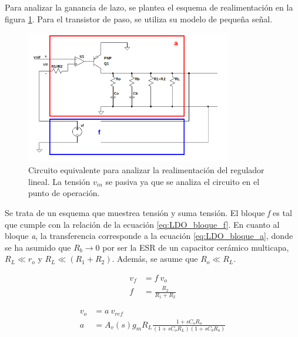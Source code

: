 Para analizar la ganancia de lazo, se plantea el esquema de realimentación en la figura \ref{fig:LDO_esquema_realimentacion}. Para el transistor de paso, se utiliza su modelo de pequeña señal. 

\begin{figure}[H]
    \centering
    \includegraphics[width=0.8\textwidth]{img/LDO_esquema_realimentacion.png}
    \caption{Circuito equivalente para analizar la realimentación del regulador lineal. La tensión $v_{in}$ se pasiva ya que se analiza el circuito en el punto de operación.}
    \label{fig:LDO_esquema_realimentacion}    
\end{figure}

Se trata de un esquema que muestrea tensión y suma tensión. El bloque \textit{f} es tal que cumple con la relación de la ecuación \eqref{eq:LDO_bloque_f}. En cuanto al bloque \textit{a}, la transferencia corresponde a la ecuación \eqref{eq:LDO_bloque_a}, donde se ha asumido que $R_b \rightarrow 0$ por ser la ESR de un capacitor cerámico multicapa, $R_L \ll r_o$ y $R_L \ll (R_1+R_2)$. Además, se asume que $R_o \ll R_L$.

\begin{subequations}
    \begin{align}
        v_f &= f \ v_o\\
        f &= \frac{R_2}{R_1 + R_2} \label{eq:LDO_bloque_f}
    \end{align}
\end{subequations}

\begin{subequations}
    \begin{align}
        v_o &= a \ v_{ref}\\
        a &= A_v(s) g_m  R_L \frac{1 + s C_o R_o}{\left( 1 + s C_o  R_L \right)  \left( 1 + s C_b R_o \right)} \label{eq:LDO_bloque_a}
    \end{align}
\end{subequations}

